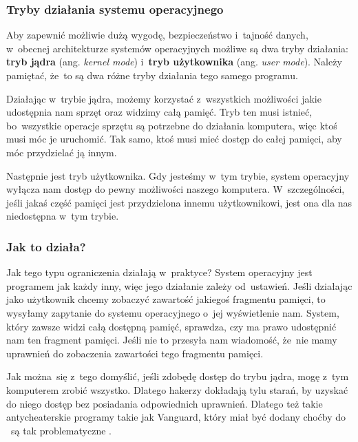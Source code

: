 \documentclass[10pt,t]{beamer}
\begin{document}
\begin{frame}
  \frametitle{Tryby działania systemu operacyjnego}


  Aby zapewnić możliwie dużą wygodę, bezpieczeństwo i~tajność danych,
  w~obecnej architekturze systemów operacyjnych możliwe są dwa tryby
  działania: \textbf{tryb jądra} (ang. \textit{kernel mode})
  i~\textbf{tryb użytkownika} (ang. \textit{user mode}). Należy pamiętać,
  że~to są dwa różne tryby działania tego samego programu.

  Działając w~trybie jądra, możemy korzystać z~wszystkich możliwości jakie
  udostępnia nam sprzęt oraz widzimy całą pamięć. Tryb ten musi istnieć,
  bo~wszystkie operacje sprzętu są potrzebne do działania komputera, więc
  ktoś musi móc je uruchomić. Tak samo, ktoś musi mieć dostęp do całej
  pamięci, aby móc przydzielać ją innym.

  Następnie jest tryb użytkownika. Gdy jesteśmy w~tym trybie, system
  operacyjny wyłącza nam dostęp do pewny możliwości naszego komputera.
  W~szczególności, jeśli jakaś część pamięci jest przydzielona innemu
  użytkownikowi, jest ona dla nas niedostępna w~tym trybie.

\end{frame}





\begin{frame}
  \frametitle{Jak to działa?}


  Jak tego typu ograniczenia działają w~praktyce? System operacyjny jest
  programem jak każdy inny, więc jego działanie zależy od~ustawień. Jeśli
  działając jako użytkownik chcemy zobaczyć zawartość jakiegoś fragmentu
  pamięci, to wysyłamy zapytanie do systemu operacyjnego o~jej wyświetlenie
  nam. System, który zawsze widzi całą dostępną pamięć, sprawdza, czy ma
  prawo udostępnić nam ten fragment pamięci. Jeśli nie to przesyła nam
  wiadomość, że~nie mamy uprawnień do zobaczenia zawartości tego fragmentu
  pamięci.

  Jak można~się z~tego domyślić, jeśli zdobędę dostęp do trybu jądra, mogę
  z~tym komputerem zrobić wszystko. Dlatego hakerzy dokładają tylu starań,
  by uzyskać do niego dostęp \alert{bez} posiadania odpowiednich uprawnień.
  Dlatego też takie antycheaterskie programy takie jak Vanguard, który miał
  być dodany choćby do
  ~są tak problematyczne
  \parencite{Low-Level-Why-Riots-anti-cheat-is-a-HUGE-problem-Ver-2024}.

\end{frame}
\end{document}
